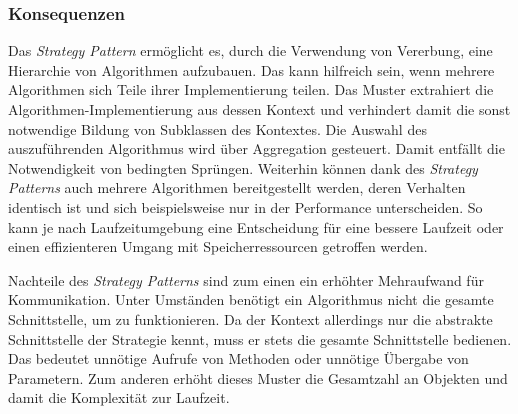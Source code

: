 \subsubsection*{Konsequenzen}
Das \emph{Strategy Pattern} ermöglicht es, durch die Verwendung von Vererbung, eine Hierarchie von Algorithmen aufzubauen. Das kann hilfreich sein, wenn mehrere Algorithmen sich Teile ihrer Implementierung teilen. Das Muster extrahiert die Algorithmen-Implementierung aus dessen Kontext und verhindert damit die sonst notwendige Bildung von Subklassen des Kontextes. Die Auswahl des auszuführenden Algorithmus wird über Aggregation gesteuert. Damit entfällt die Notwendigkeit von bedingten Sprüngen. Weiterhin können dank des \emph{Strategy Patterns} auch mehrere Algorithmen bereitgestellt werden, deren Verhalten identisch ist und sich beispielsweise nur in der Performance unterscheiden. So kann je nach Laufzeitumgebung eine Entscheidung für eine bessere Laufzeit oder einen effizienteren Umgang mit Speicherressourcen getroffen werden.

Nachteile des \emph{Strategy Patterns} sind zum einen ein erhöhter Mehraufwand für Kommunikation. Unter Umständen benötigt ein Algorithmus nicht die gesamte Schnittstelle, um zu funktionieren. Da der Kontext allerdings nur die abstrakte Schnittstelle der Strategie kennt, muss er stets die gesamte Schnittstelle bedienen. Das bedeutet unnötige Aufrufe von Methoden oder unnötige Übergabe von Parametern. Zum anderen erhöht dieses Muster die Gesamtzahl an Objekten und damit die Komplexität zur Laufzeit. \cite{gamma_design_1995}